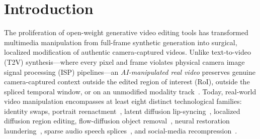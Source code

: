 \documentclass[10pt,twocolumn]{article}
\begin{document}
\section{Introduction}
\label{sec:intro}

The proliferation of open-weight generative video editing tools has transformed multimedia manipulation from full-frame synthetic generation into surgical, localized modification of authentic camera-captured videos. Unlike text-to-video (T2V) synthesis---where every pixel and frame violates physical camera image signal processing (ISP) pipelines---an \emph{AI-manipulated real video} preserves genuine camera-captured context outside the edited region of interest (RoI), outside the spliced temporal window, or on an unmodified modality track~\cite{yan2024df40,cai2025avdeepfake1mpp,kang2026manividlens}. Today, real-world video manipulation encompasses at least eight distinct technological families: identity swaps, portrait reenactment~\cite{guo2024liveportrait}, latent diffusion lip-syncing~\cite{li2024latentsync}, localized diffusion region editing, flow-diffusion object removal~\cite{zhou2023propainter,bian2025videopainter,li2025diffuerasor}, neural restoration laundering~\cite{zhou2022codeformer}, sparse audio speech splices~\cite{cai2024avdeepfake1m,huang2026avfable}, and social-media recompression~\cite{ntire2026deepfake}.
\end{document}
